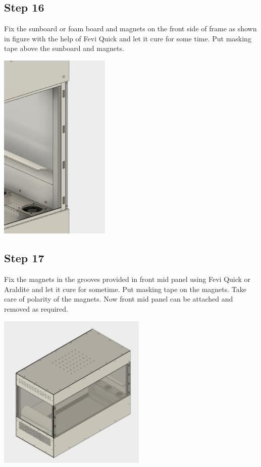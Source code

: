 \documentclass[a4paper,12pt,oneside]{book}
\begin{document}
\subsection*{Step 16}
Fix the sunboard or foam board and magnets on the front side of frame as shown in figure with the help of Fevi Quick and let it cure for some time. Put masking tape above the sunboard and magnets.\\
\begin{center}
 \includegraphics[width=150pt]{16} 
  \end{center}
\subsection*{Step 17}
Fix the magnets in the grooves provided in front mid panel using Fevi Quick or Araldite and let it cure for sometime. Put masking tape on the magnets. Take care of polarity of the magnets. Now front mid panel can be attached and removed as required.\\
\begin{center}
 \includegraphics[width=200pt]{17}
  \end{center}
\end{document}
